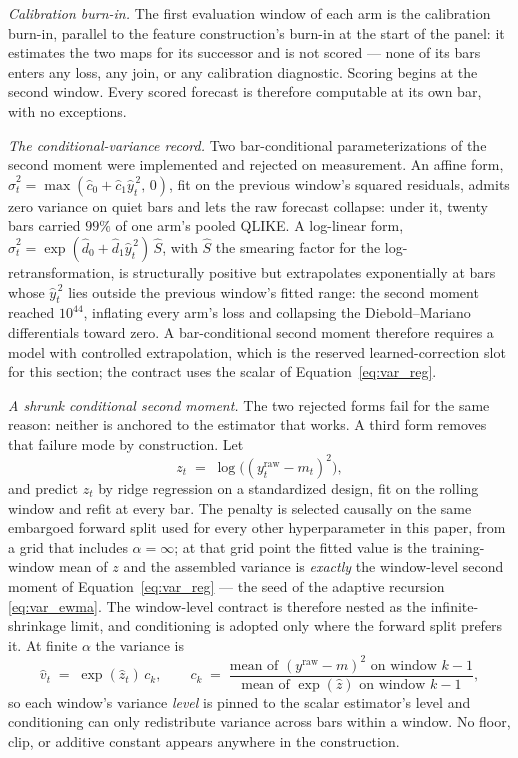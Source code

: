 \emph{Calibration burn-in.} The first evaluation window of each arm is
the calibration burn-in, parallel to the feature construction's burn-in
at the start of the panel: it estimates the two maps for its successor
and is not scored --- none of its bars enters any loss, any join, or any
calibration diagnostic. Scoring begins at the second window. Every
scored forecast is therefore computable at its own bar, with no
exceptions.

\emph{The conditional-variance record.} Two bar-conditional
parameterizations of the second moment were implemented and rejected on
measurement. An affine form,
$\hat{\sigma}^2_t = \max(\hat{c}_0 + \hat{c}_1 \hat{y}_t^{\,2},\, 0)$,
fit on the previous window's squared residuals, admits zero variance on
quiet bars and lets the raw forecast collapse: under it, twenty bars
carried $99\%$ of one arm's pooled QLIKE. A log-linear form,
$\hat{\sigma}^2_t
= \exp(\hat{d}_0 + \hat{d}_1 \hat{y}_t^{\,2})\,\hat{S}$, with $\hat{S}$
the \citet{Duan1983} smearing factor for the log-retransformation, is
structurally positive but extrapolates exponentially at bars whose
$\hat{y}_t^{\,2}$ lies outside the previous window's fitted range: the
second moment reached $10^{44}$, inflating every arm's loss and
collapsing the Diebold--Mariano differentials toward zero. A
bar-conditional second moment therefore requires a model with controlled
extrapolation, which is the reserved learned-correction slot for this
section; the contract uses the scalar of Equation~\eqref{eq:var_reg}.

\emph{A shrunk conditional second moment.} The two rejected forms fail
for the same reason: neither is anchored to the estimator that works.
A third form removes that failure mode by construction. Let
\[
z_t \;=\; \log\bigl( (y^{\mathrm{raw}}_t - m_t)^2 \bigr),
\]
and predict $z_t$ by ridge regression on a standardized design, fit on
the rolling window and refit at every bar. The penalty is selected
causally on the same embargoed forward split used for every other
hyperparameter in this paper, from a grid that includes
$\alpha = \infty$; at that grid point the fitted value is the
training-window mean of $z$ and the assembled variance is
\emph{exactly} the window-level second moment of
Equation~\eqref{eq:var_reg} --- the seed of the adaptive recursion
\eqref{eq:var_ewma}. The window-level contract is therefore nested as
the infinite-shrinkage limit, and conditioning is adopted only where the
forward split prefers it. At finite $\alpha$ the variance is
\[
\hat{v}_t \;=\; \exp(\hat{z}_t)\, c_k,
\qquad
c_k \;=\;
\frac{\text{mean of } (y^{\mathrm{raw}} - m)^2 \text{ on window } k-1}
     {\text{mean of } \exp(\hat{z}) \text{ on window } k-1},
\]
so each window's variance \emph{level} is pinned to the scalar
estimator's level and conditioning can only redistribute variance across
bars within a window. No floor, clip, or additive constant appears
anywhere in the construction.

